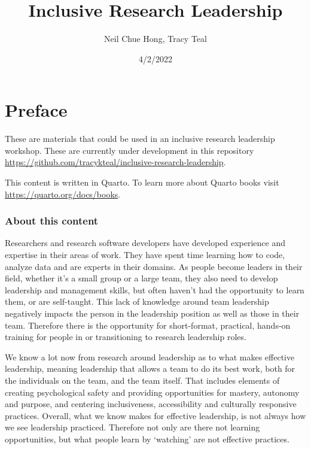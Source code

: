 \documentclass[
  letterpaper,
  DIV=11,
  numbers=noendperiod]{scrreprt}
\title{Inclusive Research Leadership}
\author{Neil Chue Hong, Tracy Teal}
\date{4/2/2022}
\renewcommand*\contentsname{Table of contents}
\begin{document}
\maketitle

\ifdefined\Shaded\renewenvironment{Shaded}{\begin{tcolorbox}[boxrule=0pt, enhanced, frame hidden, sharp corners, interior hidden, borderline west={3pt}{0pt}{shadecolor}]}{\end{tcolorbox}}\fi

\renewcommand*\contentsname{Table of contents}
{
\hypersetup{linkcolor=}
\setcounter{tocdepth}{2}
\tableofcontents
}
\hypertarget{preface}{%
\chapter*{Preface}\label{preface}}

These are materials that could be used in an inclusive research
leadership workshop. These are currently under development in this
repository
\url{https://github.com/tracykteal/inclusive-research-leadership}.

This content is written in Quarto. To learn more about Quarto books
visit \url{https://quarto.org/docs/books}.

\hypertarget{about-this-content}{%
\subsection*{About this content}\label{about-this-content}}

Researchers and research software developers have developed experience
and expertise in their areas of work. They have spent time learning how
to code, analyze data and are experts in their domains. As people become
leaders in their field, whether it's a small group or a large team, they
also need to develop leadership and management skills, but often haven't
had the opportunity to learn them, or are self-taught. This lack of
knowledge around team leadership negatively impacts the person in the
leadership position as well as those in their team. Therefore there is
the opportunity for short-format, practical, hands-on training for
people in or transitioning to research leadership roles.

We know a lot now from research around leadership as to what makes
effective leadership, meaning leadership that allows a team to do its
best work, both for the individuals on the team, and the team itself.
That includes elements of creating psychological safety and providing
opportunities for mastery, autonomy and purpose, and centering
inclusiveness, accessibility and culturally responsive practices.
Overall, what we know makes for effective leadership, is not always how
we see leadership practiced. Therefore not only are there not learning
opportunities, but what people learn by `watching' are not effective
practices.
\end{document}
